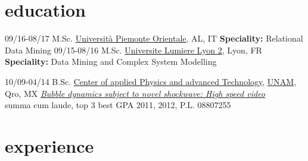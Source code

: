 \documentclass[]{friggeri-cv}
\begin{document}
\section{education}

\begin{entrylist}
\entry
{09/16-08/17}
{M.Sc. \href{http://www.em-dmkm.eu/}
	{}}
{\href{http://www.uniupo.it/}{Università Piemonte Orientale}, AL, IT}
{\textbf{Speciality:} Relational Data Mining
}
\entry
{09/15-08/16}
{M.Sc. \href{http://www.em-dmkm.eu/}
             {}}
     {\href{http://www.univ-lyon2.fr/}{Universite Lumiere Lyon 2}, Lyon, FR}
    {\textbf{Speciality:} Data Mining and Complex System Modelling}
    
\entry
{10/09-04/14}
{B.Sc. \href{http://www.fata.unam.mx/tecnologia}
             {}}
  {\href{http://www.fata.unam.mx/}{Center of applied Physics and advanced Technology}, \href{http://www.unam.mx/}{UNAM}, Qro, MX}           
{\href{https://dl.dropboxusercontent.com/u/2115508/Tesis.pdf}{\emph{Bubble dynamics subject to novel shockwave: High speed video}}\\
summa cum laude, top 3 best GPA 2011, 2012, P.L. 08807255
}
\end{entrylist}


\section{experience}
\end{document}
